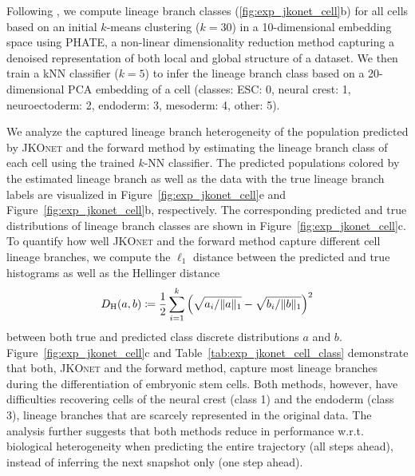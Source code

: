 Following \citet[Fig. 6, Suppl. Note 4]{moon2019visualizing}, we compute lineage branch classes (\cref{fig:exp_jkonet_cell}b) for all cells based on an initial $k$-means clustering ($k=30$) in a 10-dimensional embedding space using PHATE, a non-linear dimensionality reduction method capturing a denoised representation of both local and global structure of a dataset.
We then train a \acrfull{kNN} classifier ($k=5$) to infer the lineage branch class based on a 20-dimensional \acrshort{PCA} embedding of a cell (classes: ESC: 0, neural crest: 1, neuroectoderm: 2, endoderm: 3, mesoderm: 4, other: 5).

We analyze the captured lineage branch heterogeneity of the population predicted by \textsc{JKOnet} and the forward method by estimating the lineage branch class of each cell using the trained $k$-NN classifier. The predicted populations colored by the estimated lineage branch as well as the data with the true lineage branch labels are visualized in Figure~\ref{fig:exp_jkonet_cell}e and Figure~\ref{fig:exp_jkonet_cell}b, respectively.
The corresponding predicted and true distributions of lineage branch classes are shown in Figure~\ref{fig:exp_jkonet_cell}c.
To quantify how well \textsc{JKOnet} and the forward method capture  different cell lineage branches, we compute the $\ell_1$ distance between the  predicted and true histograms as well as the Hellinger distance 
\begin{equation} \label{eq:hellinger}
    D_{\mathrm{H}}(a, b) \coloneqq \frac{1}{2} \sum_{i=1}^{k}\left(\sqrt{a_{i}/\|a\|_1}-\sqrt{b_{i}/\|b\|_1}\right)^{2}
\end{equation}
between both true and predicted class discrete distributions $a$ and $b$.
Figure~\ref{fig:exp_jkonet_cell}c and Table~\ref{tab:exp_jkonet_cell_class} demonstrate that both, \textsc{JKOnet} and the forward method, capture most lineage branches during the differentiation of embryonic stem cells. Both methods, however, have difficulties recovering cells of the neural crest (class 1) and the endoderm (class 3), lineage branches that are scarcely represented in the original data. 
The analysis further suggests that both methods reduce in performance w.r.t. biological heterogeneity when predicting the entire trajectory (all steps ahead), instead of inferring the next snapshot only (one step ahead).


